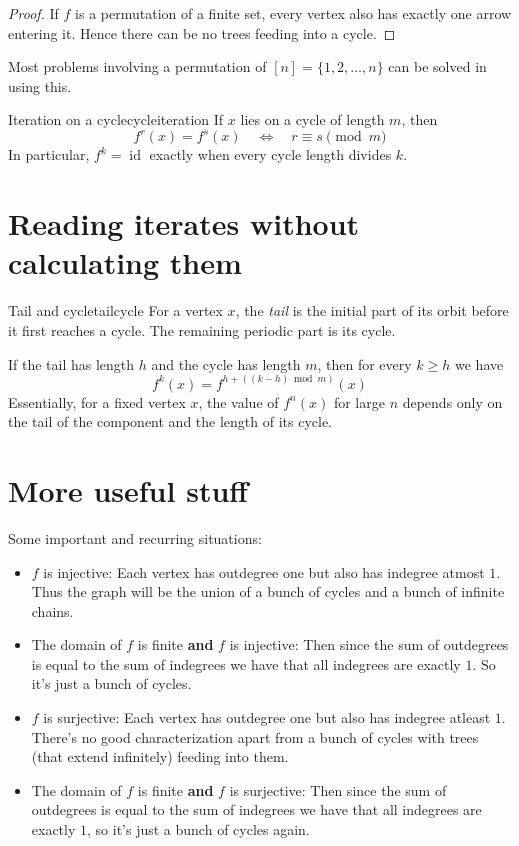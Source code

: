 \documentclass[11pt]{scrartcl}
\newcommand{\id}{\operatorname{id}}
\begin{document}
\begin{proof}
  If \(f\) is a permutation of a finite set, every vertex 
  also has exactly one arrow entering it. Hence there can 
  be no trees feeding into a cycle.
\end{proof}
Most problems involving a permutation of \([n]=\{1, 2, \dots, n\}\) 
can be solved in using this.

\begin{claim}{Iteration on a cycle}{cycleiteration}
If \(x\) lies on a cycle of length \(m\), then
\[f^r(x)=f^s(x)\quad\Longleftrightarrow\quad r\equiv s\pmod m\]
In particular, \(f^k=\id\) exactly when every cycle length divides \(k\).
\end{claim}


\section{Reading iterates without calculating them}

\begin{definition}{Tail and cycle}{tailcycle}
For a vertex \(x\), the \emph{tail} is the initial part of its orbit before it first reaches a cycle. The remaining periodic part is its cycle.
\end{definition}

If the tail has length \(h\) and the cycle has length \(m\), then for every \(k\ge h\) we have 
\[f^k(x)=f^{h+((k-h)\bmod m)}(x)\]Essentially, for a fixed vertex \(x\), the value of \(f^n(x)\) for large \(n\) depends only on the tail of the component and the length of its cycle.

\section{More useful stuff}

Some important and recurring situations:

\begin{itemize}
  \item \(f\) is injective: Each vertex has outdegree one but
  also has indegree atmost \(1\). Thus the graph will be the union of 
  a bunch of cycles and a bunch of infinite chains.
  \item The domain of \(f\) is finite \textbf{and} \(f\) is injective: 
  Then since the sum of outdegrees is equal to the sum of indegrees 
  we have that all indegrees are exactly \(1\). So it's just a bunch 
  of cycles.
  \item \(f\) is surjective: Each vertex has outdegree one but also 
  has indegree atleast \(1\). There's no good characterization apart from 
  a bunch of cycles with trees (that extend infinitely) feeding into them. 
  \item The domain of \(f\) is finite \textbf{and} \(f\) is surjective: 
  Then since the sum of outdegrees is equal to the sum of indegrees 
  we have that all indegrees are exactly \(1\), so it's just a bunch of 
  cycles again. 
\end{itemize}
\end{document}
